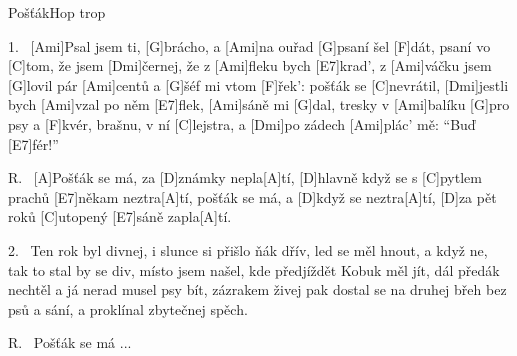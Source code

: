 \begin{song}{Pošťák}{Hop trop}

\begin{xverse}{1.~}
[Ami]Psal jsem ti, [G]brácho, a [Ami]na ouřad [G]psaní šel [F]dát,
psaní vo [C]tom, že jsem [Dmi]{čer}nej, že z [Ami]fleku bych [E7]krad',
z [Ami]váčku jsem [G]lovil pár [Ami]centů a [G]{šéf} mi vtom [F]{řek':}
pošťák se [C]nevrátil, [Dmi]jestli bych [Ami]vzal po něm [E7]flek,
[Ami]sáně mi [G]dal, tresky v [Ami]balíku [G]pro psy a [F]kvér,
brašnu, v ní [C]lejstra, a [Dmi]po zádech [Ami]plác' mě: ``Buď [E7]fér!''
\end{xverse}

\begin{xverse}{R.~}
[A]Pošťák se má, za [D]známky nepla[A]tí,
[D]hlavně když se s [C]pytlem prachů [E7]někam neztra[A]tí,
pošťák se má, a [D]když se neztra[A]tí,
[D]za pět roků [C]utopený [E7]sáně zapla[A]tí.
\end{xverse}

\begin{xverse}{2.~}
Ten rok byl divnej, i slunce si přišlo ňák dřív,
led se měl hnout, a když ne, tak to stal by se div,
místo jsem našel, kde předjíždět Kobuk měl jít,
dál předák nechtěl a já nerad musel psy bít,
zázrakem živej pak dostal se na druhej břeh
bez psů a sání, a proklínal zbytečnej spěch.
\end{xverse}

\begin{xverse}{R.~}
Pošťák se má ...
\end{xverse}

\end{song}

%
%
%
%
%


